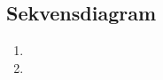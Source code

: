 
\subsection{Sekvensdiagram}

\begin{center}
	\begin{enumerate}
		\item{ 
			\begin{minipage}[t]{\linewidth}
          		\centering
			\end{minipage}
		}
		\item{ 
			\begin{minipage}[t]{\linewidth}
          		\centering
\end{minipage}}
\end{enumerate}
\end{center}
